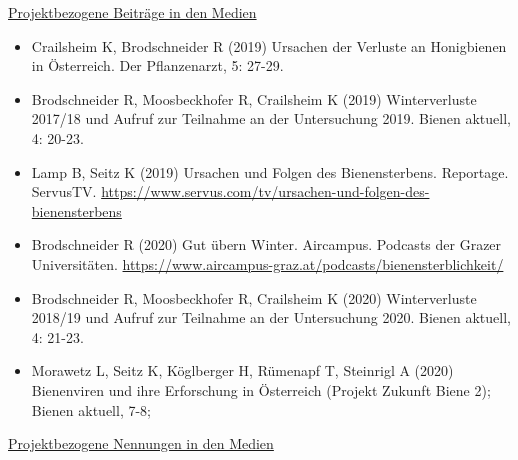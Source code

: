 \underline{Projektbezogene Beiträge in den Medien}

\begin{itemize}

    \item
    Crailsheim K, Brodschneider R (2019) Ursachen der Verluste an Honigbienen in Österreich. Der Pflanzenarzt, 5: 27-29.

    \item
    Brodschneider R, Moosbeckhofer R, Crailsheim K (2019) Winterverluste 2017/18 und Aufruf zur Teilnahme an der Untersuchung 2019. Bienen aktuell, 4: 20-23.

    \item
    Lamp B, Seitz K (2019) Ursachen und Folgen des Bienensterbens. Reportage. ServusTV. \url{https://www.servus.com/tv/ursachen-und-folgen-des-bienensterbens}
    
    \item
    Brodschneider R (2020) Gut übern Winter. Aircampus. Podcasts der Grazer Universitäten. \url{https://www.aircampus-graz.at/podcasts/bienensterblichkeit/}
    
    \item
    Brodschneider R, Moosbeckhofer R, Crailsheim K (2020) Winterverluste 2018/19 und Aufruf zur Teilnahme an der Untersuchung 2020. Bienen aktuell, 4: 21-23.
    
    \item
    Morawetz L, Seitz K, Köglberger H, Rümenapf T, Steinrigl A (2020) Bienenviren und ihre Erforschung in Österreich (Projekt Zukunft Biene 2); Bienen aktuell, 7-8; 

\end{itemize}

\underline{Projektbezogene Nennungen in den Medien}


